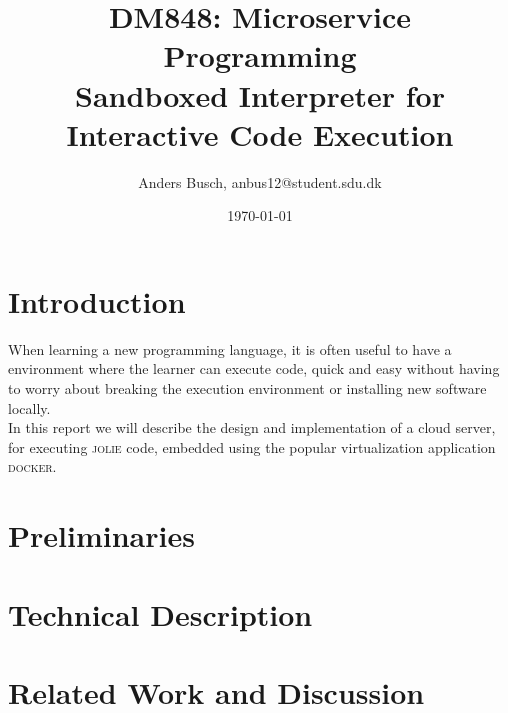 \documentclass[12pt]{article}
\title{ \textbf{DM848}: Microservice Programming \\ {\Large Sandboxed Interpreter for Interactive Code Execution} }
\author{Anders Busch, anbus12@student.sdu.dk}
\date{\today \\ \hrulefill{}}
\newcommand{\docker}[0] {\textsc{docker}}
\newcommand{\jolie}[0] {\textsc{jolie}}
\begin{document}
\maketitle

\section{Introduction}

When learning a new programming language, it is often useful to have a environment where the learner can execute code, quick and easy without having to worry about breaking the execution environment or installing new software locally. \\

\noindent{}In this report we will describe the design and implementation of a cloud server, for executing \jolie{} code, embedded using the popular virtualization application \docker{}. 

\section{Preliminaries}

\section{Technical Description}

\section{Related Work and Discussion}
\end{document}
